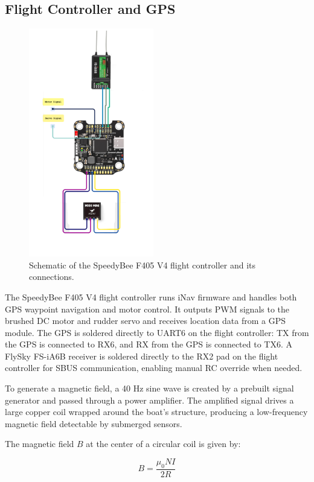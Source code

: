 \subsection{Flight Controller and GPS}
\begin{figure}[H]
    \centering
    \includegraphics[height=10cm]{speedybee.png}
    \caption{Schematic of the SpeedyBee F405 V4 flight controller and its connections.}
    \label{fig:Speedybee}
\end{figure}

The SpeedyBee F405 V4 flight controller runs iNav firmware and handles both GPS waypoint navigation and motor control. It outputs PWM signals to the brushed DC motor and rudder servo and receives location data from a GPS module. The GPS is soldered directly to UART6 on the flight controller: TX from the GPS is connected to RX6, and RX from the GPS is connected to TX6. A FlySky FS-iA6B receiver is soldered directly to the RX2 pad on the flight controller for SBUS communication, enabling manual RC override when needed.

To generate a magnetic field, a 40 Hz sine wave is created by a prebuilt signal generator and passed through a power amplifier. The amplified signal drives a large copper coil wrapped around the boat’s structure, producing a low-frequency magnetic field detectable by submerged sensors.

The magnetic field \( B \) at the center of a circular coil is given by:

\begin{equation}
B = \frac{\mu_0 N I}{2R}
\label{eq:bfield}
\end{equation}


